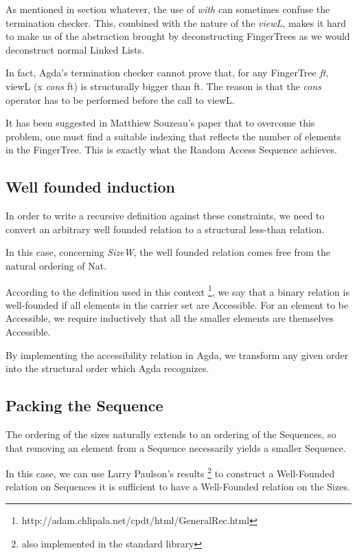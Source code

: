 \documentclass[12pt,twoside,notitlepage]{report}
\begin{document}
As mentioned in section whatever, the use of \textit{with} can sometimes confuse the termination checker. This, combined with the nature of the \textit{viewL}, makes it hard to make us of the abstraction brought by deconstructing FingerTrees as we would deconstruct normal Linked Lists.

In fact, Agda's termination checker cannot prove that, for any FingerTree \textit{ft}, viewL (x \textit{cons} ft) is structurally bigger than ft. The reason is that the \textit{cons} operator has to be performed before the call to viewL.
 
It has been suggested in Matthiew Souzeau's paper \cite{coq} that to overcome this problem, one must find a suitable indexing that reflects the number of elements in the FingerTree. This is exactly what the Random Access Sequence achieves.

\subsection{Well founded induction}

In order to write a recursive definition against these constraints, we need to convert an arbitrary well founded relation to a structural less-than relation. 

In this case, concerning \textit{SizeW}, the well founded relation comes free from the natural ordering of Nat. 

According to the definition used in this context \footnote{http://adam.chlipala.net/cpdt/html/GeneralRec.html}, we say that a binary relation is well-founded if all elements in the carrier set are Accessible. For an element to be Accessible, we require inductively that all the smaller elements are themselves Accessible.

By implementing the accessibility relation in Agda, we transform any given order into the structural order which Agda recognizes.

\subsection{Packing the Sequence}

The ordering of the sizes naturally extends to an ordering of the Sequences, so that removing an element from a Sequence necessarily yields a smaller Sequence.

In this case, we can use Larry Paulson's results \footnote{also implemented in the standard library} to construct a Well-Founded relation on Sequences it is sufficient to have a Well-Founded relation on the Sizes.
\end{document}
